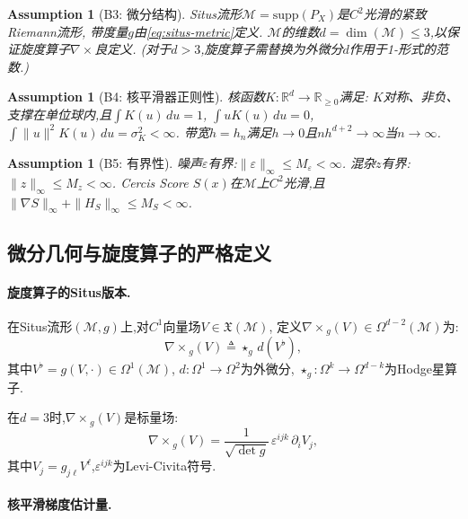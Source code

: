 \documentclass[12pt,a4paper]{article}
\newtheorem{assumption}[theorem]{Assumption}
\newcommand{\R}{\mathbb{R}}
\newcommand{\cM}{\mathcal{M}}
\newcommand{\supp}{\mathrm{supp}}
\newcommand{\curl}{\nabla\! \times\!}
\newcommand{\defeq}{\triangleq}
\begin{document}
\begin{assumption}[B3: 微分结构]\label{ass:B3}
    Situs流形$\cM = \supp(P_X)$是$C^2$光滑的紧致Riemann流形,
    带度量$g$由\eqref{eq:situs-metric}定义.
    $\cM$的维数$d = \dim(\cM) \leq 3$,以保证旋度算子$\curl$良定义.
    (对于$d > 3$,旋度算子需替换为外微分$d$作用于1-形式的范数.)
\end{assumption}

\begin{assumption}[B4: 核平滑器正则性]\label{ass:B4}
    核函数$K: \R^d \to \R_{\geq 0}$满足:
    $K$对称、非负、支撑在单位球内,且$\int K(u)\,du = 1$,
    $\int u K(u)\,du = 0$,
    $\int \|u\|^2 K(u)\,du = \sigma_K^2 < \infty$.
    带宽$h = h_n$满足$h \to 0$且$n h^{d+2} \to \infty$当$n \to \infty$.
\end{assumption}

\begin{assumption}[B5: 有界性]\label{ass:B5}
    噪声$\varepsilon$有界:$\|\varepsilon\|_\infty \leq M_\varepsilon < \infty$.
    混杂$z$有界:$\|z\|_\infty \leq M_z < \infty$.
    Cercis Score $S(x)$在$\cM$上$C^2$光滑,且
    $\|\nabla S\|_\infty + \|H_S\|_\infty \leq M_S < \infty$.
\end{assumption}

\subsection{微分几何与旋度算子的严格定义}

\paragraph{旋度算子的Situs版本.}

在Situs流形$(\cM, g)$上,对$C^1$向量场$V \in \mathfrak{X}(\cM)$,
定义$\curl_g(V) \in \Omega^{d-2}(\cM)$为:
\begin{equation}\label{eq:curl-situs}
    \curl_g(V) \defeq \star_g\, d(V^\flat),
\end{equation}
其中$V^\flat = g(V, \cdot) \in \Omega^1(\cM)$,
$d: \Omega^1 \to \Omega^2$为外微分,
$\star_g: \Omega^k \to \Omega^{d-k}$为Hodge星算子.

在$d=3$时,$\curl_g(V)$是标量场:
\begin{equation}\label{eq:curl-3d}
    \curl_g(V) = \frac{1}{\sqrt{\det g}}\,
    \varepsilon^{ijk}\, \partial_i V_j,
\end{equation}
其中$V_j = g_{j\ell} V^\ell$,$\varepsilon^{ijk}$为Levi-Civita符号.

\paragraph{核平滑梯度估计量.}
\end{document}
